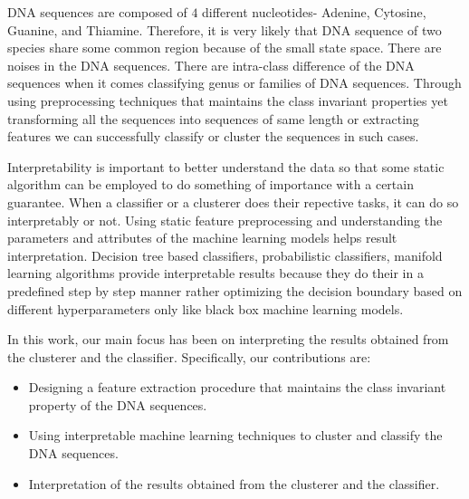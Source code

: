 \documentclass[oneside, twocolumn, a4paper, 10pt]{IEEEtran}
\begin{document}
\par
DNA sequences are composed of $4$ different nucleotides- Adenine, Cytosine, Guanine, and Thiamine. Therefore, it is very likely that DNA sequence of two species share some common region because of the small state space. There are noises in the DNA sequences. There are intra-class difference of the DNA sequences when it comes classifying genus or families of DNA sequences. Through using preprocessing techniques that maintains the class invariant properties yet transforming all the sequences into sequences of same length or extracting features we can successfully classify or cluster the sequences in such cases.\\
\par
Interpretability is important to better understand the data so that some static algorithm can be employed to do something of importance with a certain guarantee. When a classifier or a clusterer does their repective tasks, it can do so interpretably or not. Using static feature preprocessing and understanding the parameters and attributes of the machine learning models helps result interpretation. Decision tree based classifiers, probabilistic classifiers, manifold learning algorithms provide interpretable results because they do their in a predefined step by step manner rather optimizing the decision boundary based on different hyperparameters only like black box machine learning models.\\
\par
In this work, our main focus has been on interpreting the results obtained from the clusterer and the classifier. Specifically, our contributions are:
\begin{itemize}
\item Designing a feature extraction procedure that maintains the class invariant property of the DNA sequences.
\item Using interpretable machine learning techniques to cluster and classify the DNA sequences.
\item Interpretation of the results obtained from the clusterer and the classifier.
\end{itemize}

%
\end{document}
